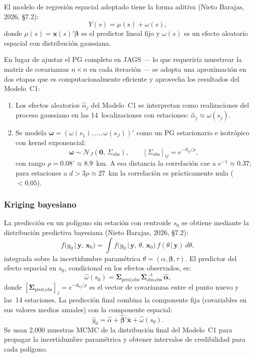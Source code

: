 ﻿\documentclass[12pt]{article}
\begin{document}
El modelo de regresi\'on espacial adoptado tiene la forma aditiva
(Nieto Barajas, 2026, \S7.2):
\[
  Y(s) = \mu(s) + \omega(s),
\]
donde $\mu(s) = \mathbf{x}(s)'\boldsymbol{\beta}$ es el predictor lineal
fijo y $\omega(s)$ es un efecto aleatorio espacial con distribuci\'on
gaussiana.

En lugar de ajustar el PG completo en JAGS --- lo que requerir\'ia
muestrear la matriz de covarianzas $n \times n$ en cada iteraci\'on ---
se adopta una aproximaci\'on en dos etapas que es computacionalmente
eficiente y aprovecha los resultados del Modelo~C1:

\begin{enumerate}
  \item Los efectos aleatorios $\hat\alpha_j$ del Modelo~C1 se interpretan
        como realizaciones del proceso gaussiano en las 14~localizaciones
        con estaciones: $\hat\alpha_j \approx \omega(s_j)$.
  \item Se modela $\boldsymbol{\omega} = (\omega(s_1),\ldots,\omega(s_J))'$
        como un PG estacionario e isotr\'opico con kernel exponencial:
        \[
          \boldsymbol{\omega} \sim \mathcal{N}_J(\mathbf{0},\,\Sigma_{\text{obs}}), \qquad
          [\Sigma_{\text{obs}}]_{ij} = e^{-d_{ij}/\rho},
        \]
        con rango $\rho = 0.08^\circ \approx 8.9$~km.
        A esa distancia la correlaci\'on cae a $e^{-1} \approx 0.37$;
        para estaciones a $d > 3\rho \approx 27$~km la correlaci\'on
        es pr\'acticamente nula ($< 0.05$).
\end{enumerate}

\subsubsection*{Kriging bayesiano}

La predicci\'on en un pol\'igono sin estaci\'on con centroide $s_0$ se
obtiene mediante la distribuci\'on predictiva bayesiana (Nieto Barajas,
2026, \S7.2):
\[
  f\!\bigl(y_0 \,\big|\, \mathbf{y},\, \mathbf{x}_0\bigr)
  = \int f\!\bigl(y_0 \,\big|\, \mathbf{y},\, \theta,\, \mathbf{x}_0\bigr)\,
          f(\theta \,|\, \mathbf{y})\, d\theta,
\]
integrada sobre la incertidumbre param\'etrica $\theta = (\alpha, \boldsymbol{\beta}, \tau)$.
El predictor del efecto espacial en $s_0$, condicional en los efectos
observados, es:
\[
  \hat\omega(s_0) = \boldsymbol{\Sigma}_{\text{pred,obs}}\,
                   \boldsymbol{\Sigma}_{\text{obs,obs}}^{-1}\,
                   \hat{\boldsymbol{\alpha}},
\]
donde $[\boldsymbol{\Sigma}_{\text{pred,obs}}]_j = e^{-d_{0j}/\rho}$
es el vector de covarianzas entre el punto nuevo y las~14 estaciones.
La predicci\'on final combina la componente fija (covariables en sus
valores medios anuales) con la componente espacial:
\[
  \hat y_0 = \hat\alpha + \hat{\boldsymbol\beta}'\bar{\mathbf{x}} + \hat\omega(s_0).
\]
Se usan 2{,}000 muestras MCMC de la distribuci\'on final del Modelo~C1
para propagar la incertidumbre param\'etrica y obtener intervalos de
credibilidad para cada pol\'igono.
\end{document}
